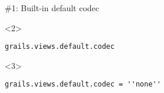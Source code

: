 \begin{frame}

    \vspace{.5cm}

    \begin{center}
      \Huge\color{red} \#1: Built-in default codec \\
    \end{center}

    \vspace{1cm}

    \begin{onlyenv}<2>
    \begin{center}
      \begin{minipage}{.9\textwidth}
        \begin{verbatim}
grails.views.default.codec
        \end{verbatim}
      \end{minipage}
    \end{center}
    \end{onlyenv}

    \begin{onlyenv}<3>
    \begin{center}
      \begin{minipage}{.9\textwidth}
        \begin{verbatim}
grails.views.default.codec = ''none''
        \end{verbatim}
      \end{minipage}
    \end{center}
    \end{onlyenv}

\end{frame}

